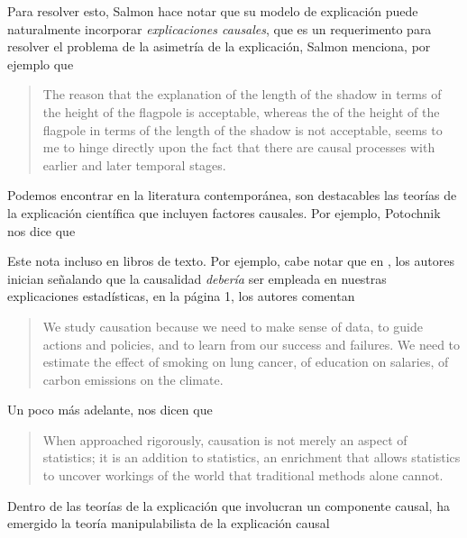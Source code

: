 Para resolver esto, Salmon hace notar que su modelo de explicación
puede naturalmente incorporar \emph{explicaciones causales}, que es
un requerimento para resolver el problema de la asimetría de la
explicación, Salmon menciona, por ejemplo que 

    \begin{quote}
    The reason that the explanation of the length of the shadow in
    terms of the height of the flagpole is acceptable, whereas the
     of the height of the flagpole in terms of the
    length of the shadow is not acceptable, seems to me to hinge
    directly upon the fact that there are causal processes with
    earlier and later temporal stages.
    \end{quote}


Podemos encontrar en la literatura contemporánea, son destacables
las teorías de la explicación científica que incluyen factores
causales. Por ejemplo, Potochnik nos dice que  \parencite[][p.~24]{Potochnik2017-POTIAT-3}

Este  nota incluso en libros de texto. Por ejemplo, cabe notar que en \parencite{Pearl2016}, los autores inician señalando que la causalidad \emph{debería} ser empleada en nuestras explicaciones estadísticas, en la página 1, los autores comentan

    \begin{quote}
    We study causation because we need to make sense of data, to 
    guide actions and policies, and to learn from our success and 
    failures. We need to estimate the effect of smoking on lung 
    cancer, of education on salaries, of carbon emissions on the 
    climate.
    \end{quote}

Un poco más adelante, nos dicen que

    \begin{quote}
    When approached rigorously, causation is not merely an aspect of
    statistics; it is an addition to statistics, an enrichment that
    allows statistics to uncover workings of the world that 
    traditional methods alone cannot.
    \end{quote}

Dentro de las teorías de la explicación que involucran un componente causal, ha emergido la teoría manipulabilista de la explicación causal
    

